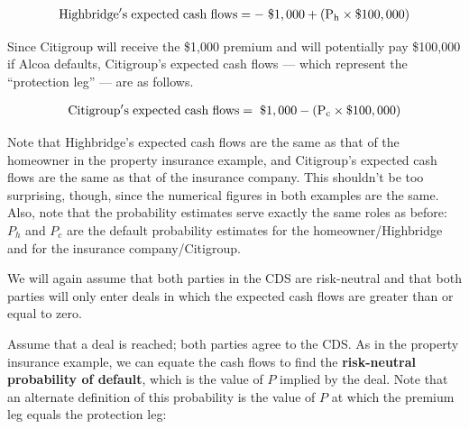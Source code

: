 \documentclass{jss}
\begin{document}
\begin{equation}
 \begin{aligned}
   {\rm Highbridge's\hspace{3pt}expected \hspace{3pt}cash \hspace{3pt}flows = -\hspace{3pt}\$1,000 + (P_h \times {\$100,000})}
    \end{aligned}
    \label{eqn:portfolioECF}
\end{equation}

Since Citigroup will receive the \$1,000 premium and will potentially pay \$100,000 if Alcoa defaults, Citigroup's expected cash flows --- which represent the ``protection leg'' --- are as follows. 

\label{eqn:CitigroupECF}
\begin{equation}
 \begin{aligned}
   {\rm Citigroup's\hspace{3pt}expected\hspace{3pt}cash\hspace{3pt}flows = \hspace{3pt}\$1,000 - (P_c \times {\$100,000})}
    \end{aligned}
\end{equation}

Note that Highbridge's expected cash flows are the same as that of the homeowner in the property insurance example, and Citigroup's expected cash flows are the same as that of the insurance company. This shouldn't be too surprising, though, since the numerical figures in both examples are the same. Also, note that the probability estimates serve exactly the same roles as before: $P_h$ and $P_c$ are the default probability estimates for the homeowner/Highbridge and for the insurance company/Citigroup.   

We will again assume that both parties in the CDS are risk-neutral and that both parties will only enter deals in which the expected cash flows are greater than or equal to zero.

Assume that a deal is reached; both parties agree to the CDS. As in the property insurance example, we can equate the cash flows to find the \textbf{risk-neutral probability of default}, which is the value of $P$ implied by the deal. Note that an alternate definition of this probability is the value of $P$ at which the premium leg equals the protection leg:
\end{document}
